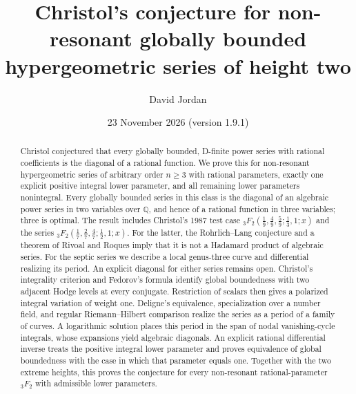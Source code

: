 \documentclass[11pt]{amsart}
\theoremstyle{definition}
\theoremstyle{remark}
\numberwithin{equation}{section}
\newcommand{\Q}{\mathbb{Q}}
\begin{document}
\title[Christol's conjecture in height two]{Christol's conjecture for non-resonant globally bounded hypergeometric series of height two}

\author{David Jordan}
\address{Maynooth University Social Sciences Institute (MUSSI), Maynooth University, Maynooth, County Kildare, Ireland}

\date{23 November 2026 (version 1.9.1)}

\begin{abstract}
Christol conjectured that every globally bounded, D-finite power series with rational coefficients is the diagonal of a rational function. We prove this for non-resonant hypergeometric series of arbitrary order $n\ge3$ with rational parameters, exactly one explicit positive integral lower parameter, and all remaining lower parameters nonintegral. Every globally bounded series in this class is the diagonal of an algebraic power series in two variables over $\Q$, and hence of a rational function in three variables; three is optimal. The result includes Christol's 1987 test case ${}_3F_2(\frac19,\frac49,\frac59;\frac13,1;x)$ and the series ${}_3F_2(\frac17,\frac27,\frac47;\frac12,1;x)$. For the latter, the Rohrlich--Lang conjecture and a theorem of Rivoal and Roques imply that it is not a Hadamard product of algebraic series. For the septic series we describe a local genus-three curve and differential realizing its period. An explicit diagonal for either series remains open. Christol's integrality criterion and Fedorov's formula identify global boundedness with two adjacent Hodge levels at every conjugate. Restriction of scalars then gives a polarized integral variation of weight one. Deligne's equivalence, specialization over a number field, and regular Riemann--Hilbert comparison realize the series as a period of a family of curves. A logarithmic solution places this period in the span of nodal vanishing-cycle integrals, whose expansions yield algebraic diagonals. An explicit rational differential inverse treats the positive integral lower parameter and proves equivalence of global boundedness with the case in which that parameter equals one. Together with the two extreme heights, this proves the conjecture for every non-resonant rational-parameter \({}_3F_2\) with admissible lower parameters.


\end{abstract}
\end{document}
